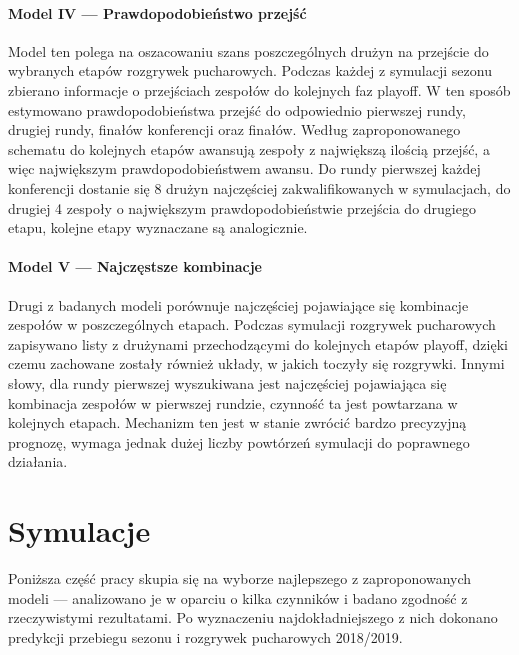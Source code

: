 \documentclass[inzynierska]{pwr_wmat_praca_dyplomowa}
\theoremstyle{plain}
\numberwithin{theorem}{chapter}
\theoremstyle{definition}
\numberwithin{theorem}{chapter}
\begin{document}
\subsubsection{Model IV --- Prawdopodobieństwo przejść}
Model ten polega na oszacowaniu szans poszczególnych drużyn na przejście do wybranych etapów rozgrywek pucharowych. Podczas każdej z symulacji sezonu zbierano informacje o przejściach zespołów do kolejnych faz playoff. W ten sposób estymowano prawdopodobieństwa przejść do odpowiednio pierwszej rundy, drugiej rundy, finałów konferencji oraz finałów. Według zaproponowanego schematu do kolejnych etapów awansują zespoły z największą ilością przejść, a więc największym prawdopodobieństwem awansu. Do rundy pierwszej każdej konferencji dostanie się 8 drużyn najczęściej zakwalifikowanych w symulacjach, do drugiej 4 zespoły o największym prawdopodobieństwie przejścia do drugiego etapu, kolejne etapy wyznaczane są analogicznie. 

\subsubsection{Model V --- Najczęstsze kombinacje}
Drugi z badanych modeli porównuje najczęściej pojawiające się kombinacje zespołów w poszczególnych etapach. Podczas symulacji rozgrywek pucharowych zapisywano listy z drużynami przechodzącymi do kolejnych etapów playoff, dzięki czemu zachowane zostały również układy, w jakich toczyły się rozgrywki. Innymi słowy, dla rundy pierwszej wyszukiwana jest najczęściej pojawiająca się kombinacja zespołów w pierwszej rundzie, czynność ta jest powtarzana w kolejnych etapach. Mechanizm ten jest w stanie zwrócić bardzo precyzyjną prognozę, wymaga jednak dużej liczby powtórzeń symulacji do poprawnego działania. 

\chapter{Symulacje}
Poniższa część pracy skupia się na wyborze najlepszego z zaproponowanych modeli --- analizowano je w oparciu o kilka czynników i badano zgodność z rzeczywistymi rezultatami. Po wyznaczeniu najdokładniejszego z nich dokonano predykcji przebiegu sezonu i rozgrywek pucharowych 2018/2019.
\end{document}
